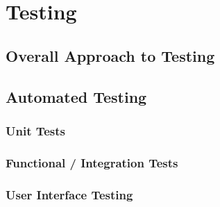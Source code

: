 \chapter{Testing}



\section{Overall Approach to Testing}
\label{testing-intro}



\section{Automated Testing}

\subsection{Unit Tests}

\subsection{Functional / Integration Tests}

\subsection{User Interface Testing}

